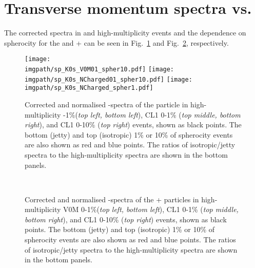 \section{Transverse momentum spectra vs. \SOPT}

The corrected spectra in \VOM and \NSPD high-multiplicity events and the dependence on spherocity for the \KOs and \LA + \AL can be seen in Fig.~\ref{fig:sphero:k0spt} and Fig.~\ref{fig:sphero:lpt}, respectively.

\begin{figure}[!htb]%
\centering%
\texttt{[image: \\imgpath/sp\_K0s\_V0M01\_spher10.pdf]}
\texttt{[image: \\imgpath/sp\_K0s\_NCharged01\_spher10.pdf]}
\texttt{[image: \\imgpath/sp\_K0s\_NCharged\_spher1.pdf]}
  \caption{Corrected and normalised \pt -spectra of the \KOs particle in high-multiplicity -1\%(\textit{top left, bottom left}), CL1 0-1\% (\textit{top middle, bottom right}), and CL1 0-10\% (\textit{top right}) events, shown as black points. The bottom (jetty) and top (isotropic) 1\% or 10\% of spherocity events are also shown as red and blue points. The ratios of isotropic/jetty spectra to the high-multiplicity spectra are shown in the bottom panels.}
\label{fig:sphero:k0spt}
\end{figure}

\begin{figure}[!htb]%
\centering%
\\
  \caption{Corrected and normalised \pt -spectra of the \LA + \AL particles in high-multiplicity V0M 0-1\%(\textit{top left, bottom left}), CL1 0-1\% (\textit{top middle, bottom right}), and CL1 0-10\% (\textit{top right}) events, shown as black points. The bottom (jetty) and top (isotropic) 1\% or 10\% of spherocity events are also shown as red and blue points. The ratios of isotropic/jetty spectra to the high-multiplicity spectra are shown in the bottom panels.}
\label{fig:sphero:lpt}
\end{figure}

